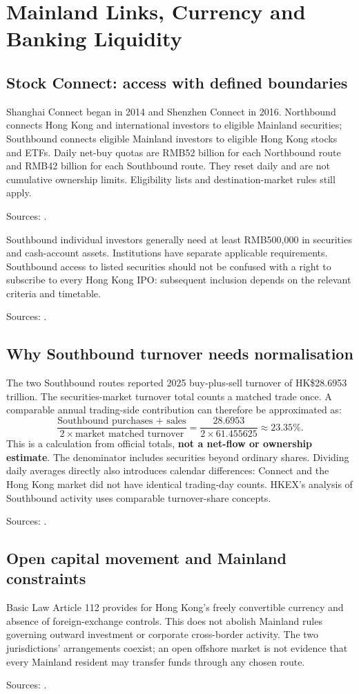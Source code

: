 \documentclass[11pt,a4paper]{article}
\newcommand{\source}[1]{\par{\footnotesize\color{ink}Sources: \cite{#1}.}\par}
\begin{document}
\section{Mainland Links, Currency and Banking Liquidity}
\subsection{Stock Connect: access with defined boundaries}
Shanghai Connect began in 2014 and Shenzhen Connect in 2016. Northbound connects Hong Kong and international investors to eligible Mainland securities; Southbound connects eligible Mainland investors to eligible Hong Kong stocks and ETFs. Daily net-buy quotas are RMB52 billion for each Northbound route and RMB42 billion for each Southbound route. They reset daily and are not cumulative ownership limits. Eligibility lists and destination-market rules still apply.\source{connect}

Southbound individual investors generally need at least RMB500,000 in securities and cash-account assets. Institutions have separate applicable requirements. Southbound access to listed securities should not be confused with a right to subscribe to every Hong Kong IPO: subsequent inclusion depends on the relevant criteria and timetable.\source{connectelig}

\subsection{Why Southbound turnover needs normalisation}
The two Southbound routes reported 2025 buy-plus-sell turnover of HK\$28.6953 trillion. The securities-market turnover total counts a matched trade once. A comparable annual trading-side contribution can therefore be approximated as:
\[
\frac{\text{Southbound purchases + sales}}{2\times\text{market matched turnover}}
=\frac{28.6953}{2\times61.455625}\approx23.35\%.
\]
This is a calculation from official totals, \textbf{not a net-flow or ownership estimate}. The denominator includes securities beyond ordinary shares. Dividing daily averages directly also introduces calendar differences: Connect and the Hong Kong market did not have identical trading-day counts. HKEX's analysis of Southbound activity uses comparable turnover-share concepts.\source{hkstats,connectinsight}

\subsection{Open capital movement and Mainland constraints}
Basic Law Article 112 provides for Hong Kong's freely convertible currency and absence of foreign-exchange controls. This does not abolish Mainland rules governing outward investment or corporate cross-border activity. The two jurisdictions' arrangements coexist; an open offshore market is not evidence that every Mainland resident may transfer funds through any chosen route.\source{basiclaw}
\end{document}
